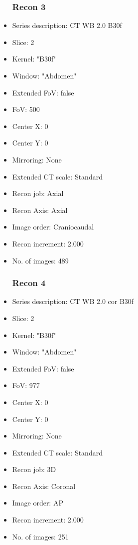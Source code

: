 \documentclass[12pt]{article}
\begin{document}
\begin{itemize}
\subsubsection{Recon 3}
\item Series description: CT WB 2.0 B30f
\item Slice: 2
\item Kernel: "B30f"
\item Window: "Abdomen"
\item Extended FoV: false
\item FoV: 500
\item Center X: 0
\item Center Y: 0
\item Mirroring: None
\item Extended CT scale: Standard
\item Recon job: Axial
\item Recon Axis: Axial
\item Image order: Craniocaudal
\item Recon increment: 2.000
\item No. of images: 489
\subsubsection{Recon 4}
\item Series description: CT WB 2.0 cor B30f
\item Slice: 2
\item Kernel: "B30f"
\item Window: "Abdomen"
\item Extended FoV: false
\item FoV: 977
\item Center X: 0
\item Center Y: 0
\item Mirroring: None
\item Extended CT scale: Standard
\item Recon job: 3D
\item Recon Axis: Coronal
\item Image order: AP
\item Recon increment: 2.000
\item No. of images: 251

\end{itemize}
\end{document}
